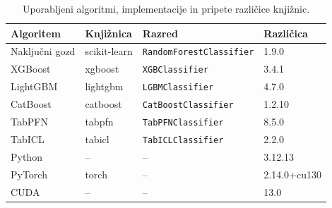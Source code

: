 \begin{table}[htbp]
\centering
\caption{Uporabljeni algoritmi, implementacije in pripete različice knjižnic.}
\label{tab:razlicice}
\begin{tabular}{llll}
\hline
Algoritem & Knjižnica & Razred & Različica \\
\hline
Naključni gozd & scikit-learn & \texttt{RandomForestClassifier} & 1.9.0 \\
XGBoost & xgboost & \texttt{XGBClassifier} & 3.4.1 \\
LightGBM & lightgbm & \texttt{LGBMClassifier} & 4.7.0 \\
CatBoost & catboost & \texttt{CatBoostClassifier} & 1.2.10 \\
TabPFN & tabpfn & \texttt{TabPFNClassifier} & 8.5.0 \\
TabICL & tabicl & \texttt{TabICLClassifier} & 2.2.0 \\
\hline
Python & -- & -- & 3.12.13 \\
PyTorch & torch & -- & 2.14.0+cu130 \\
CUDA & -- & -- & 13.0 \\
\hline
\end{tabular}
\end{table}
